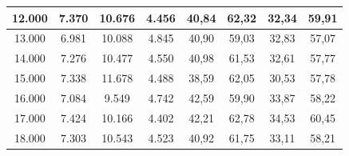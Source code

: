 \begin{table}[ht!]
\begin{tabular}{|c|c|c|c|c|c|c|c|}
12.000              & 7.370       & 10.676      & 4.456       & 40,84                                                             & 62,32                                                          & 32,34                                                               & 59,91                                                             \\ \hline
13.000              & 6.981       & 10.088      & 4.845       & 40,90                                                             & 59,03                                                          & 32,83                                                               & 57,07                                                             \\ \hline
14.000              & 7.276       & 10.477      & 4.550       & 40,98                                                             & 61,53                                                          & 32,61                                                               & 57,77                                                             \\ \hline
15.000              & 7.338       & 11.678      & 4.488       & 38,59                                                             & 62,05                                                          & 30,53                                                               & 57,78                                                             \\ \hline
16.000              & 7.084       & 9.549       & 4.742       & 42,59                                                             & 59,90                                                          & 33,87                                                               & 58,22                                                             \\ \hline
17.000              & 7.424       & 10.166      & 4.402       & 42,21                                                             & 62,78                                                          & 34,53                                                               & 60,45                                                             \\ \hline
18.000              & 7.303       & 10.543      & 4.523       & 40,92                                                             & 61,75                                                          & 33,11                                                               & 58,21                                                             \\ \hline

\end{tabular}
\end{table}
